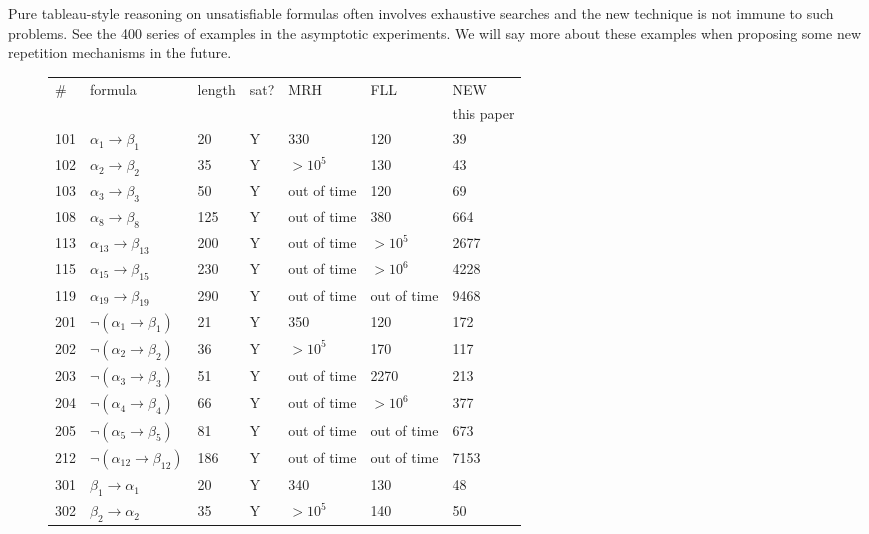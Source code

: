 \documentclass[submission,copyright,creativecommons]{eptcs}
\begin{document}
Pure tableau-style reasoning on unsatisfiable formulas
often involves
exhaustive searches and
the new technique is not immune to
such problems.
See the 400 series of examples in the asymptotic
experiments.
We will say more about these examples
when proposing some new 
repetition mechanisms
in the future.

\begin{figure}
{\small
\begin{tabular}{lllllll}
\hline
\# & formula  & length &  sat? & MRH & FLL & NEW\\
 &   &  &   & \cite{Rey:startab} & \cite{FLL10} & this paper\\
\hline
\hline
101 & $\alpha_1 \rightarrow \beta_1$ & 20  & Y & 330 & 120 & 39 \\
\hline
102 & $\alpha_2 \rightarrow \beta_2$ & 35  & Y & $>10^5$ & 130 &  43\\
\hline
103 & $\alpha_3 \rightarrow \beta_3$ & 50  & Y & out of time & 120 & 69 \\
\hline
108 & $\alpha_8 \rightarrow \beta_8$ & 125  & Y & out of time & 380 & 664 \\
\hline
113 & $\alpha_{13} \rightarrow \beta_{13}$ & 200  & Y & out of time & $>10^5$ & 2677 \\
\hline
115 & $\alpha_{15} \rightarrow \beta_{15}$ & 230  & Y & out of time & $>10^6$ & 4228 \\
\hline
119 & $\alpha_{19} \rightarrow \beta_{19}$ & 290  & Y & out of time & out of time  & 9468\\                             
\hline
\hline
201 & $\neg (\alpha_1 \rightarrow \beta_1)$ & 21  & Y & 350 & 120 & 172 \\
\hline
202 & $\neg (\alpha_2 \rightarrow \beta_2)$ & 36  & Y & $>10^5$ & 170 &  117\\
\hline
203 & $\neg (\alpha_3 \rightarrow \beta_3)$ & 51  & Y & out of time & 2270 & 213 \\
\hline
204 & $\neg ( \alpha_4 \rightarrow \beta_4)$ & 66  & Y & out of time & $> 10^6$ & 377\\
\hline
205 & $\neg ( \alpha_5 \rightarrow \beta_5)$ & 81  & Y & out of time & out of time & 673 \\
\hline
212 & $\neg ( \alpha_{12} \rightarrow \beta_{12})$ & 186  & Y & out of time &out of time & 7153 \\                   
\hline
\hline
301 & $\beta_1 \rightarrow \alpha_1$ & 20  & Y & 340 & 130 & 48 \\
\hline
302 & $\beta_2 \rightarrow \alpha_2$ & 35  & Y & $>10^5$ & 140 &  50\\

\end{tabular}}
\end{figure}
\end{document}
